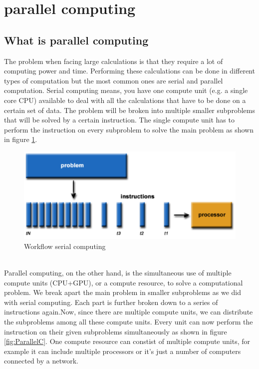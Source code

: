 \documentclass[a4paper, 11pt]{report}
\begin{document}
\section{parallel computing}
	\subsection{What is parallel computing}
The problem when facing large calculations is that they require a lot of computing power and time. Performing these calculations can be done in different types of computation but the most common ones are serial and parallel computation. Serial computing means, you have one compute unit (e.g. a single core CPU) available to deal with all the calculations that have to be done on a certain set of data. The problem will be broken into multiple smaller subproblems that will be solved by a certain instruction. The single compute unit has to perform the instruction on every subproblem to solve the main problem as shown in figure \ref{fig:SerialC}.
	\begin{figure}[h]
		\centering
		\includegraphics[scale=.4]{images/serialProblem.pdf}
		\caption{Workflow serial computing}
		\label{fig:SerialC}
	\end{figure}\\
Parallel computing, on the other hand, is the simultaneous use of multiple compute units (CPU+GPU), or a compute resource, to solve a computational problem. We break apart the main problem in smaller subproblems as we did with serial computing. Each part is further broken down to a series of instructions again.Now, since there are multiple compute units, we can distribute the subproblems among all these compute units. Every unit can now perform the instruction on their given subproblems simultaneously as shown in figure \ref{fig:ParallelC}. One compute resource can constist of multiple compute units, for example it can include multiple processors or it's just a number of computers connected by a network.
\end{document}
